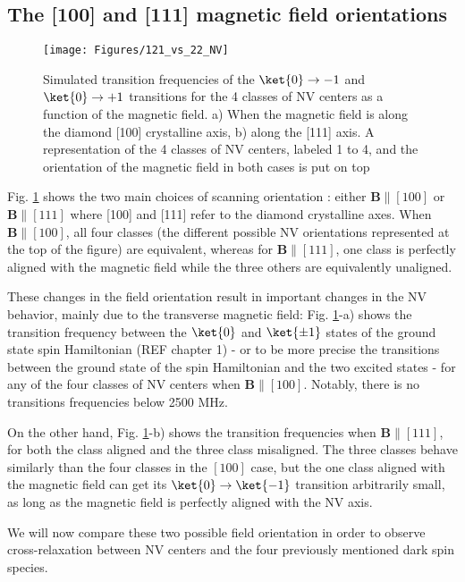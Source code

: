 \documentclass[a4paper,11pt]{report}
\begin{document}
\subsection{The [100] and [111] magnetic field orientations}
\label{sec simu}

\begin{figure}[h]
\centering
\texttt{[image: Figures/121\_vs\_22\_NV]}
\caption{Simulated transition frequencies of the $\ket{0} \to {-1}$ and $\ket{0} \to {+1}$ transitions for the 4 classes of NV centers as a function of the magnetic field. a) When the magnetic field is along the diamond [100] crystalline axis, b) along the [111] axis. A representation of the 4 classes of NV centers, labeled 1 to 4, and the orientation of the magnetic field in both cases is put on top}
\label{121 vs 22 NV}
\end{figure}

Fig. \ref{121 vs 22 NV} shows the two main choices of scanning orientation : either $\mathbf{B} \parallel [100]$ or 
$\mathbf{B} \parallel [111]$ where [100] and [111] refer to the diamond crystalline axes. When $\mathbf{B} \parallel [100]$, all four classes (the different possible NV orientations represented at the top of the figure) are equivalent, whereas for $\mathbf{B} \parallel [111]$, one class is perfectly aligned with the magnetic field while the three others are equivalently unaligned. 

These changes in the field orientation result in important changes in the NV behavior, mainly due to the transverse magnetic field: Fig. \ref{121 vs 22 NV}-a) shows the transition frequency between the $\ket{0}$ and $\ket{\pm 1}$ states of the ground state spin Hamiltonian (REF chapter 1) - or to be more precise the transitions between the ground state of the spin Hamiltonian and the two excited states - for any of the four classes of NV centers when $\mathbf{B} \parallel [100]$. Notably, there is no transitions frequencies below 2500 MHz. 

On the other hand, Fig. \ref{121 vs 22 NV}-b) shows the transition frequencies when $\mathbf{B} \parallel [111]$, for both the class aligned and the three class misaligned. The three classes behave similarly than the four classes in the $[100]$ case, but the one class aligned with the magnetic field can get its $\ket{0}\to\ket{-1}$ transition arbitrarily small, as long as the magnetic field is perfectly aligned with the NV axis.

We will now compare these two possible field orientation in order to observe cross-relaxation between NV centers and the four previously mentioned dark spin species.
\end{document}
